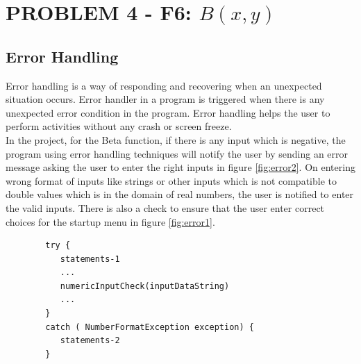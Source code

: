 \documentclass[letterpaper, 11pt]{article}
\begin{document}
\tableofcontents
\listoffigures

\pagebreak
\section{{PROBLEM 4 - F6: $B(x,y)$}}
    \subsection{Error Handling}
    Error handling is a way of responding and recovering when an unexpected situation occurs. Error handler in a program is triggered when there is any unexpected error condition in the program. Error handling helps the user to perform activities without any crash or screen freeze.
    \newline \\
    In the project, for the Beta function, if there is any input which is negative, the program using error handling techniques will notify the user by sending an error message asking the user to enter the right inputs in figure \ref{fig:error2}. On entering wrong format of inputs like strings or other inputs which is not compatible to double values which is in the domain of real numbers, the user is notified to enter the valid inputs. There is also a check to ensure that the user enter correct choices for the startup menu in figure \ref{fig:error1}.
    \newline
    \begin{lstlisting}
        try {
           statements-1
           ...
           numericInputCheck(inputDataString)
           ...
        }
        catch ( NumberFormatException exception) {
           statements-2
        }
    \end{lstlisting}
    
\end{document}
